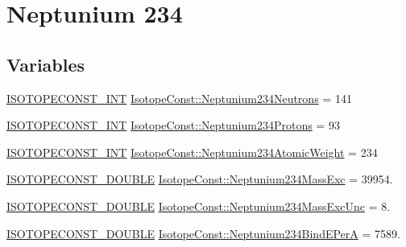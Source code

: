 \hypertarget{group___isotope_const-_neptunium-_np234}{}\section{Neptunium 234}
\label{group___isotope_const-_neptunium-_np234}
\subsection*{Variables}
\begin{DoxyCompactItemize}
\item 
\mbox{\hyperlink{group___isotope_const-_macros_ga5f18360b3e99483a35c32d789e62621c}{I\+S\+O\+T\+O\+P\+E\+C\+O\+N\+S\+T\+\_\+\+I\+NT}} \mbox{\hyperlink{group___isotope_const-_neptunium-_np234_ga57f48e640408545e7b0655ba7926b969}{Isotope\+Const\+::\+Neptunium234\+Neutrons}} = 141
\item 
\mbox{\hyperlink{group___isotope_const-_macros_ga5f18360b3e99483a35c32d789e62621c}{I\+S\+O\+T\+O\+P\+E\+C\+O\+N\+S\+T\+\_\+\+I\+NT}} \mbox{\hyperlink{group___isotope_const-_neptunium-_np234_ga88993ad6569d882f5afef5c3e8d510e4}{Isotope\+Const\+::\+Neptunium234\+Protons}} = 93
\item 
\mbox{\hyperlink{group___isotope_const-_macros_ga5f18360b3e99483a35c32d789e62621c}{I\+S\+O\+T\+O\+P\+E\+C\+O\+N\+S\+T\+\_\+\+I\+NT}} \mbox{\hyperlink{group___isotope_const-_neptunium-_np234_ga932ef4fea18b27cb38a6100c2eb1e7f4}{Isotope\+Const\+::\+Neptunium234\+Atomic\+Weight}} = 234
\item 
\mbox{\hyperlink{group___isotope_const-_macros_ga8f45a7272ce02c0b4c65c44636ed719a}{I\+S\+O\+T\+O\+P\+E\+C\+O\+N\+S\+T\+\_\+\+D\+O\+U\+B\+LE}} \mbox{\hyperlink{group___isotope_const-_neptunium-_np234_gac90df5f2b034014780d1a1ad67b83bce}{Isotope\+Const\+::\+Neptunium234\+Mass\+Exc}} = 39954.
\item 
\mbox{\hyperlink{group___isotope_const-_macros_ga8f45a7272ce02c0b4c65c44636ed719a}{I\+S\+O\+T\+O\+P\+E\+C\+O\+N\+S\+T\+\_\+\+D\+O\+U\+B\+LE}} \mbox{\hyperlink{group___isotope_const-_neptunium-_np234_gaedb3eb001cc2d2cc3f96ca83cd5780f2}{Isotope\+Const\+::\+Neptunium234\+Mass\+Exc\+Unc}} = 8.
\item 
\mbox{\hyperlink{group___isotope_const-_macros_ga8f45a7272ce02c0b4c65c44636ed719a}{I\+S\+O\+T\+O\+P\+E\+C\+O\+N\+S\+T\+\_\+\+D\+O\+U\+B\+LE}} \mbox{\hyperlink{group___isotope_const-_neptunium-_np234_ga2d89107b7a609b536a7c6aae13d24550}{Isotope\+Const\+::\+Neptunium234\+Bind\+E\+PerA}} = 7589.
\item 

\end{DoxyCompactItemize}
